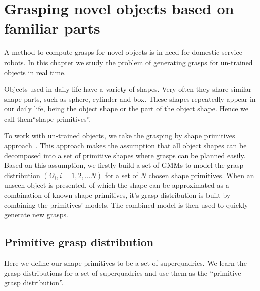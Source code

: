 \section{Grasping novel objects based on familiar parts}
\label{cha3:sec4}
A method to compute grasps for novel objects is in need for domestic service robots. In this chapter we study the problem of generating grasps for un-trained objects in real time.

Objects used in daily life have a variety of shapes. Very often they share similar shape parts, such as sphere, cylinder and box. These shapes repeatedly appear in our daily life, being the object shape or the part of the object shape. Hence we call them``shape primitives''.

To work with un-trained objects, we take the grasping by shape primitives approach~\citep{miller2003automatic}. This approach makes the assumption that all object shapes can be decomposed into a set of primitive shapes where grasps can be planned easily. Based on this assumption, we firstly build a set of GMMs to model the grasp distribution $\left(\Omega_i, i=1,2,...N\right)$ for a set of $N$ chosen shape primitives. When an unseen object is presented, of which the shape can be approximated as a combination of known shape primitives, it's grasp distribution is built by combining the primitives' models. The combined model is then used to quickly generate new grasps.



\subsection{Primitive grasp distribution}
\label{cha3:sec4:pgdistribution}
Here we define our shape primitives to be a set of superquadrics. We learn the grasp distributions for a set of superquadrics and use them as the ``primitive grasp distribution''.


